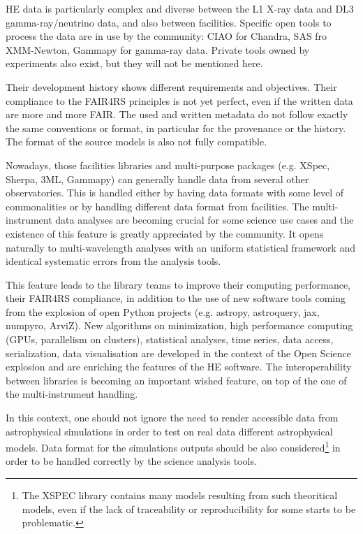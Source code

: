 \documentclass[11pt,a4paper]{ivoa}
\begin{document}
HE data is particularly complex and diverse between the L1 X-ray data and DL3 gamma-ray/neutrino data, and also between
facilities. Specific open tools to process the data are in use by the community: CIAO for Chandra, SAS fro XMM-Newton,
Gammapy for gamma-ray data. Private tools owned by experiments also exist, but they will not be mentioned here.

Their development history shows different requirements and objectives. Their compliance to the FAIR4RS principles is not
yet perfect, even if the written data are more and more FAIR. The used and written metadata do not follow exactly the same
conventions or format, in particular for the provenance or the history. The format of the source models is also not fully
compatible.

Nowadays, those facilities libraries and multi-purpose packages (e.g. XSpec, Sherpa, 3ML, Gammapy) can generally handle
data from several other observatories. This is handled either by having data formats with some level of commonalities or
by handling different data format from facilities. The multi-instrument data analyses are becoming crucial for some
science use cases and the existence of this feature is  greatly appreciated by the community. It opens naturally to
multi-wavelength analyses with an uniform statistical framework and identical systematic errors from the analysis tools.

This feature leads to the library teams to improve their computing performance, their FAIR4RS compliance, in addition to
the use of new software tools coming from the explosion of open Python projects (e.g. astropy, astroquery, jax, numpyro,
ArviZ). New algorithms on minimization, high performance computing (GPUs, parallelism on clusters), statistical analyses,
time series, data access, serialization, data visualisation are developed in the context of the Open Science explosion
and are enriching the features of the HE software. The interoperability between libraries is becoming an important wished
feature, on top of the one of the multi-instrument handling.

In this context, one should not ignore the need to render accessible data from astrophysical simulations in order to test
on real data different astrophysical models. Data format for the simulations outputs should be also considered\footnote{The
XSPEC library contains many models resulting from such theoritical models, even if the lack of traceability or
reproducibility for some starts to be problematic.} in order to be handled correctly by the science analysis tools.
\end{document}
